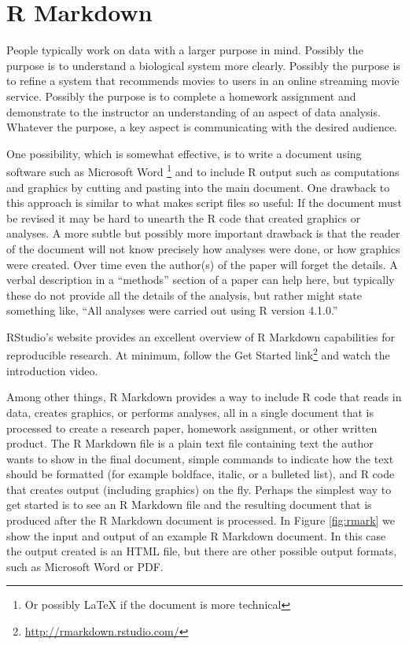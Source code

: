 \documentclass[
]{krantz}
\renewcommand{\href}[2]{#2\footnote{\url{#1}}}
\begin{document}
\hypertarget{markdown}{%
\section{R Markdown}\label{markdown}}

People typically work on data with a larger purpose in mind. Possibly the purpose is to understand a biological system more clearly. Possibly the purpose is to refine a system that recommends movies to users in an online streaming movie service. Possibly the purpose is to complete a homework assignment and demonstrate to the instructor an understanding of an aspect of data analysis. Whatever the purpose, a key aspect is communicating with the desired audience.

One possibility, which is somewhat effective, is to write a document using software such as Microsoft Word \footnote{Or possibly LaTeX if the document is more technical} and to include R output such as computations and graphics by cutting and pasting into the main document. One drawback to this approach is similar to what makes script files so useful: If the document must be revised it may be hard to unearth the R code that created graphics or analyses. A more subtle but possibly more important drawback is that the reader of the document will not know precisely how analyses were done, or how graphics were created. Over time even the author(s) of the paper will forget the details. A verbal description in a ``methods'' section of a paper can help here, but typically these do not provide all the details of the analysis, but rather might state something like, ``All analyses were carried out using R version 4.1.0.''

RStudio's website provides an excellent overview of R Markdown capabilities for reproducible research. At minimum, follow the \href{http://rmarkdown.rstudio.com/}{Get Started link} and watch the introduction video.

Among other things, R Markdown provides a way to include R code that reads in data, creates graphics, or performs analyses, all in a single document that is processed to create a research paper, homework assignment, or other written product. The R Markdown file is a plain text file containing text the author wants to show in the final document, simple commands to indicate how the text should be formatted (for example boldface, italic, or a bulleted list), and R code that creates output (including graphics) on the fly. Perhaps the simplest way to get started is to see an R Markdown file and the resulting document that is produced after the R Markdown document is processed. In Figure \ref{fig:rmark} we show the input and output of an example R Markdown document. In this case the output created is an HTML file, but there are other possible output formats, such as Microsoft Word or PDF.
\end{document}
